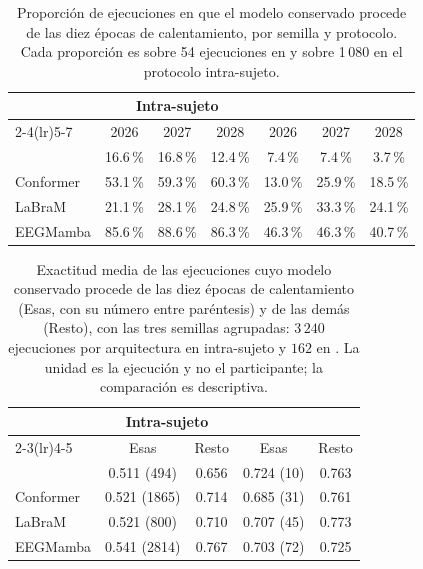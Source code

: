 \begin{table}[H]
\centering
\caption{Proporción de ejecuciones en que el modelo conservado procede de las diez épocas de
calentamiento, por semilla y protocolo. Cada proporción es sobre 54 ejecuciones en \loso{} y
sobre 1\,080 en el protocolo intra-sujeto.}
\label{tab:seleccion-intra}
\small
\begin{tabular}{lcccccc}
\toprule
 & \multicolumn{3}{c}{\textbf{Intra-sujeto}} & \multicolumn{3}{c}{\textbf{\loso{}}} \\
\cmidrule(lr){2-4}\cmidrule(lr){5-7}
 & 2026 & 2027 & 2028 & 2026 & 2027 & 2028 \\
\midrule
\eegnet{} & 16.6\,\% & 16.8\,\% & 12.4\,\% & 7.4\,\% & 7.4\,\% & 3.7\,\% \\
Conformer & 53.1\,\% & 59.3\,\% & 60.3\,\% & 13.0\,\% & 25.9\,\% & 18.5\,\% \\
LaBraM & 21.1\,\% & 28.1\,\% & 24.8\,\% & 25.9\,\% & 33.3\,\% & 24.1\,\% \\
EEGMamba & 85.6\,\% & 88.6\,\% & 86.3\,\% & 46.3\,\% & 46.3\,\% & 40.7\,\% \\
\bottomrule
\end{tabular}
\end{table}

\begin{table}[H]
\centering
\caption{Exactitud media de las ejecuciones cuyo modelo conservado procede de las diez épocas de
calentamiento (Esas, con su número entre paréntesis) y de las demás (Resto), con las tres semillas
agrupadas: $3\,240$ ejecuciones por arquitectura en intra-sujeto y $162$ en \loso{}. La unidad es la
ejecución y no el participante; la comparación es descriptiva.}
\label{tab:seleccion-exactitud}
\small
\begin{tabular}{lcccc}
\toprule
 & \multicolumn{2}{c}{\textbf{Intra-sujeto}} & \multicolumn{2}{c}{\textbf{\loso{}}} \\
\cmidrule(lr){2-3}\cmidrule(lr){4-5}
 & Esas & Resto & Esas & Resto \\
\midrule
\eegnet{}  & 0.511 (494)  & 0.656 & 0.724 (10) & 0.763 \\
Conformer  & 0.521 (1865) & 0.714 & 0.685 (31) & 0.761 \\
LaBraM     & 0.521 (800)  & 0.710 & 0.707 (45) & 0.773 \\
EEGMamba   & 0.541 (2814) & 0.767 & 0.703 (72) & 0.725 \\
\bottomrule
\end{tabular}
\end{table}


